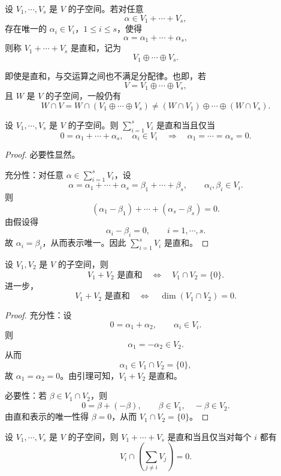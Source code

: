 \begin{definition}\label{p1:concept:c4-l1080}
	设 $V_1,\cdots,V_s$ 是 $V$ 的子空间。若对任意
	\[
	\alpha\in V_1+\cdots+V_s,
	\]
	存在唯一的 $\alpha_i\in V_i$，$1\leq i\leq s$，使得
	\[
	\alpha=\alpha_1+\cdots+\alpha_s,
	\]
	则称 $V_1+\cdots+V_s$ 是直和，记为
	\[
	V_1\oplus\cdots\oplus V_s.
	\]
\end{definition}

即使是直和，与交运算之间也不满足分配律。也即，若
\[
V=V_1\oplus\cdots\oplus V_s,
\]
且 $W$ 是 $V$ 的子空间，一般仍有
\[
W\cap V
=
W\cap (V_1\oplus\cdots\oplus V_s)
\neq
(W\cap V_1)\oplus\cdots\oplus(W\cap V_s).
\]

\begin{lemma}
	设 $V_1,\cdots,V_s$ 是 $V$ 的子空间。则 $\sum\limits_{i=1}^{s}V_i$ 是直和当且仅当
	\[
	0=\alpha_1+\cdots+\alpha_s,
	\quad \alpha_i\in V_i
	\quad\Longrightarrow\quad
	\alpha_1=\cdots=\alpha_s=0.
	\]
\end{lemma}

\begin{proof}
	必要性显然。
	
	充分性：对任意 $\alpha\in\sum\limits_{i=1}^{s}V_i$，设
	\[
	\alpha=\alpha_1+\cdots+\alpha_s
	=\beta_1+\cdots+\beta_s,
	\qquad
	\alpha_i,\beta_i\in V_i.
	\]
	则
	\[
	(\alpha_1-\beta_1)+\cdots+(\alpha_s-\beta_s)=0.
	\]
	由假设得
	\[
	\alpha_i-\beta_i=0,
	\qquad i=1,\cdots,s.
	\]
	故 $\alpha_i=\beta_i$，从而表示唯一。因此 $\sum\limits_{i=1}^{s}V_i$ 是直和。
\end{proof}

\begin{corollary}
	设 $V_1,V_2$ 是 $V$ 的子空间，则
	\[
	V_1+V_2\text{ 是直和}
	\quad\Longleftrightarrow\quad
	V_1\cap V_2=\{0\}.
	\]
	进一步，
	\[
	V_1+V_2\text{ 是直和}
	\quad\Longleftrightarrow\quad
	\dim(V_1\cap V_2)=0.
	\]
\end{corollary}

\begin{proof}
	充分性：设
	\[
	0=\alpha_1+\alpha_2,
	\qquad
	\alpha_i\in V_i.
	\]
	则
	\[
	\alpha_1=-\alpha_2\in V_2.
	\]
	从而
	\[
	\alpha_1\in V_1\cap V_2=\{0\},
	\]
	故 $\alpha_1=\alpha_2=0$。由引理可知，$V_1+V_2$ 是直和。
	
	必要性：若 $\beta\in V_1\cap V_2$，则
	\[
	0=\beta+(-\beta),
	\qquad
	\beta\in V_1,
	\quad
	-\beta\in V_2.
	\]
	由直和表示的唯一性得 $\beta=0$，从而 $V_1\cap V_2=\{0\}$。
\end{proof}

\begin{corollary}
	设 $V_1,\cdots,V_s$ 是 $V$ 的子空间，则 $V_1+\cdots+V_s$ 是直和当且仅当对每个 $i$ 都有
	\[
	V_i\cap\left(\sum_{j\neq i}V_j\right)=0.
	\]
\end{corollary}

